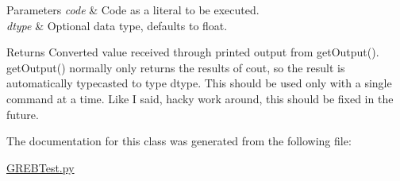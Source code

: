\begin{DoxyParams}{Parameters}
{\em code} & Code as a literal to be executed. \\
\hline
{\em dtype} & Optional data type, defaults to float. \\
\hline
\end{DoxyParams}
\begin{DoxyReturn}{Returns}
Converted value received through printed output from get\+Output(). get\+Output() normally only returns the results of cout, so the result is automatically typecasted to type dtype. This should be used only with a single command at a time. Like I said, hacky work around, this should be fixed in the future. 
\end{DoxyReturn}


The documentation for this class was generated from the following file\+:\begin{DoxyCompactItemize}
\item 
\hyperlink{_g_r_e_b_test_8py}{G\+R\+E\+B\+Test.\+py}\end{DoxyCompactItemize}
